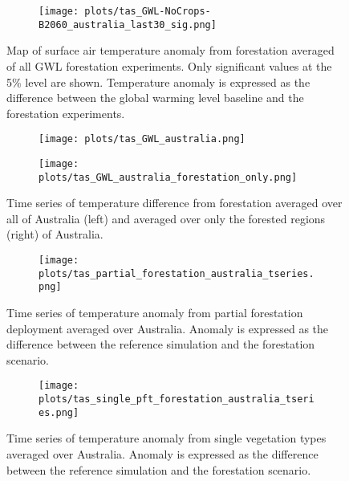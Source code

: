 \documentclass[]{article}
\begin{document}
\begin{figure}[H]
    \centering
    \begin{subfigure}[b]{\linewidth}
        \texttt{[image: plots/tas\_GWL-NoCrops-B2060\_australia\_last30\_sig.png]}
    \end{subfigure}
    \caption{Map of surface air temperature anomaly from forestation averaged of all GWL forestation experiments. Only significant values at the 5\% level are shown. Temperature anomaly is expressed as the difference between the global warming level baseline and the forestation experiments.}
    \label{fig:tas_australia_map}
\end{figure}

\begin{figure}[H]
    \centering
    \begin{subfigure}[b]{0.4\linewidth}
        \texttt{[image: plots/tas\_GWL\_australia.png]}
    \end{subfigure}
    \begin{subfigure}[b]{0.4\linewidth}
        \texttt{[image: plots/tas\_GWL\_australia\_forestation\_only.png]}
    \end{subfigure}
    \caption{Time series of temperature difference from forestation averaged over all of Australia (left) and averaged over only the forested regions (right) of Australia.}
    \label{fig:tas_australia_timeseries}
\end{figure}

\begin{figure}[H]
    \centering
    \begin{subfigure}[b]{\linewidth}
        \texttt{[image: plots/tas\_partial\_forestation\_australia\_tseries.png]}
    \end{subfigure}
    \caption{Time series of temperature anomaly from partial forestation deployment averaged over Australia. Anomaly is expressed as the difference between the reference simulation and the forestation scenario.}
    \label{fig:tas_australia_partial}
\end{figure}

\begin{figure}[H]
    \centering
    \begin{subfigure}[b]{\linewidth}
        \texttt{[image: plots/tas\_single\_pft\_forestation\_australia\_tseries.png]}
    \end{subfigure}
    \caption{Time series of temperature anomaly from single vegetation types averaged over Australia. Anomaly is expressed as the difference between the reference simulation and the forestation scenario.}
    \label{fig:tas_australia_single}
\end{figure}
\end{document}
